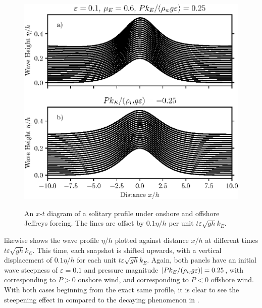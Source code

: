 \documentclass{jfm}
\renewcommand*{\epsilon}{\varepsilon}
\begin{document}
\begin{figure}
  \centering
  { %
    \label{fig:xt_offset_solitary:a}
    \label{fig:xt_offset_solitary:b}
  }
  \includegraphics{XT-Offset.eps}
  \caption{
    An $x$-$t$ diagram of a solitary profile under
    onshore and
    offshore Jeffreys forcing.
    The lines are offset by $0.1 \eta/h$ per unit $t \epsilon \sqrt{g h}
    k_E$.
  }
  \label{fig:xt_offset_solitary}
\end{figure}

 likewise shows the wave profile $\eta/h$
plotted against distance $x/h$ at different times $t \epsilon \sqrt{g h}
k_E$.
This time, each snapshot is shifted upwards, with a vertical
displacement of $0.1 \eta/h$ for each unit $t\epsilon \sqrt{g h} k_E$.
Again, both panels have an initial wave steepness of $\epsilon = 0.1$
and pressure magnitude $\abs{P k_E/(\rho_w g \epsilon)} = 0.25$, with
 corresponding to $P>0$ onshore wind,
and  corresponding to $P<0$ offshore
wind.
With both cases beginning from the exact same profile, it is clear to
see the steepening effect in  compared
to the decaying phenomenon in .
\end{document}
